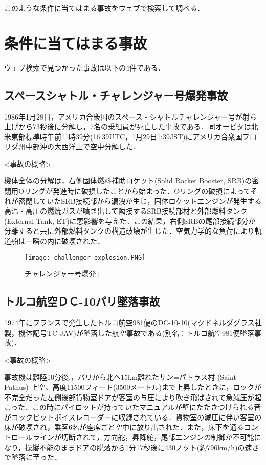 このような条件に当てはまる事故をウェブで検索して調べる．

\section{条件に当てはまる事故}
ウェブ検索で見つかった事故は以下の4件である．

\subsection{スペースシャトル・チャレンジャー号爆発事故}

1986年1月28日，アメリカ合衆国のスペース・シャトルチャレンジャー号が射ち上げから73秒後に分解し，7名の乗組員が死亡した事故である．同オービタは北米東部標準時午前11時39分(16:39UTC，1月29日1:39JST)にアメリカ合衆国フロリダ州中部沖の大西洋上で空中分解した．

<事故の概略>

機体全体の分解は，右側固体燃料補助ロケット(Solid Rocket Booster, SRB)の密閉用Oリングが発進時に破損したことから始まった．Oリングの破損によってそれが密閉していたSRB接続部から漏洩が生じ，固体ロケットエンジンが発生する高温・高圧の燃焼ガスが噴き出して隣接するSRB接続部材と外部燃料タンク(External Tank, ET)に悪影響を与えた．この結果，右側SRBの尾部接続部分が分離すると共に外部燃料タンクの構造破壊が生じた．空気力学的な負荷により軌道船は一瞬の内に破壊された\cite{bakuhatuziko}．

\begin{figure}[H]
\centering
\texttt{[image: challenger\_explosion.PNG]}
\caption{チャレンジャー号爆発」}\label{サンプル図}
\end{figure}


\subsection{トルコ航空ＤＣ-10パリ墜落事故}

1974年にフランスで発生したトルコ航空981便のDC-10-10(マクドネルダグラス社製，機体記号TC-JAV)が墜落した航空事故である(別名：トルコ航空981便墜落事故)．

<事故の概略>

事故機は離陸10分後,，パリから北へ15km離れたサン=パトゥス村 (Saint-Pathus) 上空、高度11500フィート(3500メートル)まで上昇したときに，ロックが不完全だった左側後部貨物室ドアが客室の与圧により吹き飛ばされて急減圧が起こった．この時にパイロットが持っていたマニュアルが壁にたたきつけられる音がコックピットボイスレコーダーに収録されている．貨物室の減圧に伴い客室の床が破壊され，乗客6名が座席ごと空中に放り出された．また，床下を通るコントロールラインが切断されて，方向舵，昇降舵，尾部エンジンの制御が不可能になり，操縦不能のままドアの脱落から1分17秒後に430ノット(約796km/h)の速さで墜落に至った\cite{toruko}．


